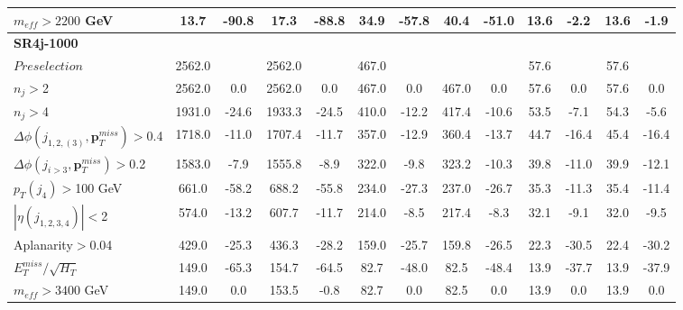 \documentclass[a4paper,11pt]{article}
\begin{document}
\begin{landscape}
\begin{table}[h]
\begin{tabular}{ | l | c c c c  || c c c c || c c c c | }
\\ 
$m_{eff}>2200$ GeV &13.7&-90.8&17.3&-88.8&34.9&-57.8&40.4&-51.0&13.6&-2.2&13.6&-1.9
\\ \hline 
							\multicolumn{13}{|l|}{\textbf{SR4j-1000}} \\ \hline		
$Preselection$&2562.0&&2562.0&&467.0&&&&57.6&&57.6&
\\
$n_j>$2&2562.0&0.0&2562.0&0.0&467.0&0.0&467.0&0.0&57.6&0.0&57.6&0.0
\\
$n_j>$4&1931.0&-24.6&1933.3&-24.5&410.0&-12.2&417.4&-10.6&53.5&-7.1&54.3&-5.6
\\
$\Delta \phi(j_{1,2,(3)},\mathbf{p}_T^{miss})>$0.4&1718.0&-11.0&1707.4&-11.7&357.0&-12.9&360.4&-13.7&44.7&-16.4&45.4&-16.4
\\
$\Delta \phi(j_{i>3},\mathbf{p}_T^{miss})>$0.2&1583.0&-7.9&1555.8&-8.9&322.0&-9.8&323.2&-10.3&39.8&-11.0&39.9&-12.1
\\
$p_T(j_4)>$100 GeV&661.0&-58.2&688.2&-55.8&234.0&-27.3&237.0&-26.7&35.3&-11.3&35.4&-11.4
\\
$|\eta(j_{1,2,3,4})|<$2&574.0&-13.2&607.7&-11.7&214.0&-8.5&217.4&-8.3&32.1&-9.1&32.0&-9.5
\\
Aplanarity$>$0.04&429.0&-25.3&436.3&-28.2&159.0&-25.7&159.8&-26.5&22.3&-30.5&22.4&-30.2
\\
$E_T^{miss}/\sqrt{H_T}$&149.0&-65.3&154.7&-64.5&82.7&-48.0&82.5&-48.4&13.9&-37.7&13.9&-37.9
\\
$m_{eff}>3400$ GeV &149.0&0.0&153.5&-0.8&82.7&0.0&82.5&0.0&13.9&0.0&13.9&0.0
\\
	
				\bottomrule \bottomrule
				\end{tabular}

			\end{table}				
		\end{landscape}
		
		
		
\end{document}
